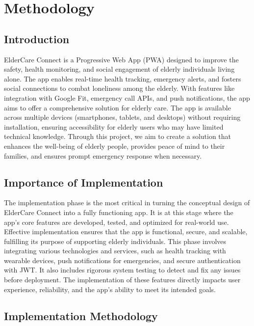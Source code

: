 

\newpage
\chapter{Methodology}


\section{Introduction}
ElderCare Connect is a Progressive Web App (PWA) designed to improve the safety, health monitoring, and social engagement of elderly individuals living alone. The app enables real-time health tracking, emergency alerts, and fosters social connections to combat loneliness among the elderly. With features like integration with Google Fit, emergency call APIs, and push notifications, the app aims to offer a comprehensive solution for elderly care.  
The app is available across multiple devices (smartphones, tablets, and desktops) without requiring installation, ensuring accessibility for elderly users who may have limited technical knowledge. Through this project, we aim to create a solution that enhances the well-being of elderly people, provides peace of mind to their families, and ensures prompt emergency response when necessary\cite{eldercare_solutions}.

\section{Importance of Implementation}
The implementation phase is the most critical in turning the conceptual design of ElderCare Connect into a fully functioning app. It is at this stage where the app's core features are developed, tested, and optimized for real-world use. Effective implementation ensures that the app is functional, secure, and scalable, fulfilling its purpose of supporting elderly individuals.  
This phase involves integrating various technologies and services, such as health tracking with wearable devices, push notifications for emergencies, and secure authentication with JWT. It also includes rigorous system testing to detect and fix any issues before deployment. The implementation of these features directly impacts user experience, reliability, and the app's ability to meet its intended goals\cite{pwa_development}.

\section{Implementation Methodology}

